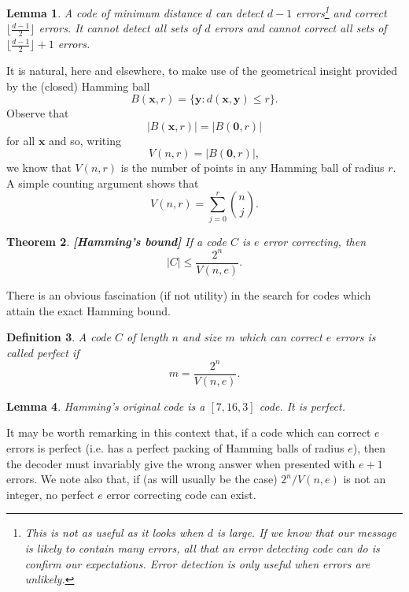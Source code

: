 \documentclass[12pt,a4paper]{article}
\theoremstyle{plain}
\newtheorem{theorem}{Theorem}[section]
\newtheorem{lemma}[theorem]{Lemma}
\newtheorem{definition}[theorem]{Definition}
\theoremstyle{definition}
\begin{document}
    \begin{lemma}
        \label{minimum distance}
        A code of minimum distance
        $d$ can detect $d-1$ errors\footnote{This is not
        as useful as it looks when $d$ is large. If we know
        that our message is likely to contain many
        errors, all that an error detecting code
        can do is confirm our expectations.
        Error detection is only useful when errors are
        unlikely.} and correct
        $\lfloor\frac{d-1}{2}\rfloor$ errors.
        It cannot detect all sets of $d$ errors
        and cannot correct all sets of
        $\lfloor\frac{d-1}{2}\rfloor+1$ errors.
    \end{lemma}
    It is natural, here and elsewhere, to make use
    of the geometrical insight provided by the
    (closed) Hamming ball
    \[B({\mathbf x},r)=\{{\mathbf y}:
    d({\mathbf x},{\mathbf y})\leq r\}.\]
    Observe that
    \[|B({\mathbf x},r)|=|B({\boldsymbol 0},r)|\]
    for all ${\mathbf x}$ and so, writing
    \[V(n,r)=|B({\boldsymbol 0},r)|,\]
    we know that $V(n,r)$ is the number of points in any
    Hamming ball of radius $r$. A simple counting
    argument shows that
    \[V(n,r)=\sum_{j=0}^{r}\binom{n}{j}.\]
    \begin{theorem}{\bf [Hamming's bound]}
        \label{Hamming's bound} If a
        code $C$ is $e$ error correcting, then
        \[|C|\leq \frac{2^{n}}{V(n,e)}.\]
    \end{theorem}

    There is an obvious fascination (if not utility)
    in the search for codes which attain the
    exact Hamming bound.
    \begin{definition}
        A code $C$ of length $n$
        and size $m$ which can correct $e$ errors
        is called \emph{perfect} if
        \[m=\frac{2^{n}}{V(n,e)}.\]
    \end{definition}
    \begin{lemma}
        Hamming's original code is
        a $[7,16,3]$ code. It is perfect.
    \end{lemma}
    It may be worth remarking in this context
    that, if a code which can correct $e$ errors
    is perfect (i.e. has a perfect packing
    of Hamming balls of radius $e$),
    then the decoder must invariably
    give the wrong answer when presented with
    $e+1$ errors. We note also that,
    if (as will usually be the case)
    $2^{n}/V(n,e)$ is not an integer, no
    perfect $e$ error correcting code can exist.
\end{document}
